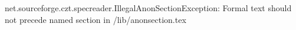 net.sourceforge.czt.specreader.IllegalAnonSectionException: Formal text should not precede named section in /lib/anonsection.tex